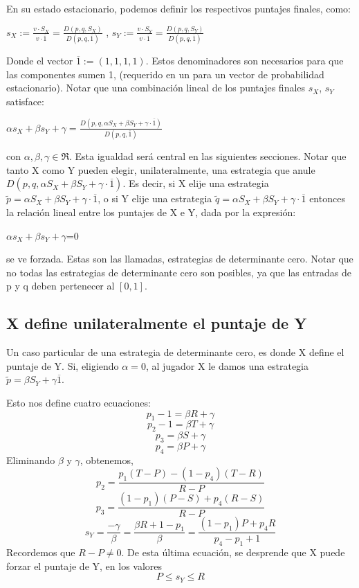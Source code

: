 \documentclass[11pt]{article}
\begin{document}
En su estado estacionario, podemos definir los respectivos puntajes finales, como:
\begin{center}
$s_X:=\frac{v \cdot S_X}{v \cdot \overline1} = \frac{D(p,q,S_X)}{D(p,q,\overline1)}$ , 
$s_Y:=\frac{v \cdot S_Y}{v \cdot \overline1} = \frac{D(p,q,S_Y)}{D(p,q,\overline1)}$
\end{center}
Donde el vector $\overline1:=(1,1,1,1)$. Estos denominadores son necesarios para que las
componentes sumen 1, (requerido en un para un vector de probabilidad estacionario).
Notar que una combinación lineal de los puntajes finales $s_X$, $s_Y$ satisface:
\begin{center}
 $\alpha s_X + \beta s_Y + \gamma=\frac{D(p,q,\alpha S_X + \beta S_Y + \gamma\cdot \overline1)}{D(p,q,\overline1)}$
\end{center}
con $\alpha, \beta, \gamma \in \Re$.\newline
Esta igualdad será central en las siguientes secciones.
Notar que tanto X como Y pueden elegir, unilateralmente, una
estrategia que anule $D(p,q,\alpha S_X + \beta S_Y + \gamma\cdot \overline1)$. Es decir, si X elije una estrategia 
$\tilde{p}= \alpha S_X + \beta S_Y + \gamma\cdot \overline1$, o si Y elije una estrategia
$\tilde{q}= \alpha S_X + \beta S_Y + \gamma\cdot \overline1$ entonces la relación lineal entre
los puntajes de X e Y, dada por la expresión:
\begin{center}
$\alpha s_X + \beta s_Y + \gamma$=0
\end{center}
se ve forzada.
Estas son las llamadas, estrategias de determinante cero.
Notar que no todas las estrategias de determinante cero son posibles, ya que las entradas de p y q deben pertenecer al $[0,1]$.

\subsection{X define unilateralmente el puntaje de Y}
Un caso particular de una estrategia de determinante cero, es donde X define el puntaje de Y.
Si, eligiendo $\alpha=0$, al jugador X le damos una estrategia $\tilde{p}=\beta S_Y + \gamma \overline1$.

Esto nos define cuatro ecuaciones:
$$p_1-1=\beta R + \gamma$$
$$p_2-1=\beta T + \gamma$$
$$p_3=\beta S + \gamma$$
$$p_4=\beta P + \gamma$$
Eliminando $\beta$ y $\gamma$, obtenemos,
$$p_2=\frac{p_1(T-P)-(1-p_4)(T-R)}{R-P}$$
$$p_3=\frac{(1-p_1)(P-S)+p_4(R-S)}{R-P}$$
$$s_Y=\frac{-\gamma}{\beta}=\frac{\beta R+ 1-p_1}{\beta}=\frac{(1-p_1)P+p_4 R}{p_4-p_1+1}$$
Recordemos que $R-P\neq 0$.
De esta última ecuación, se desprende que X puede forzar el puntaje de Y, en los valores
$$P\leq s_Y\leq R $$
\end{document}
